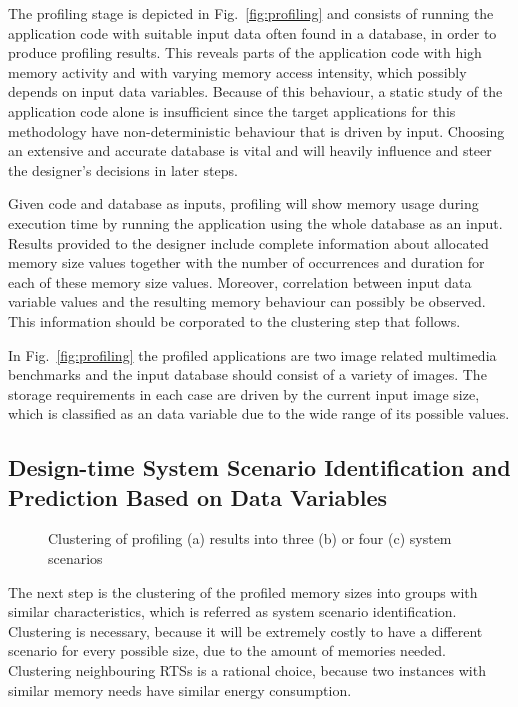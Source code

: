 \documentclass{acm_proc_article-sp}
\begin{document}
The profiling stage is depicted in Fig.~\ref{fig:profiling} and consists of running the application code with suitable input data often found in a database, in order to produce profiling results. This reveals parts of the application code with high memory activity and with varying memory access intensity, which possibly depends on input data variables. Because of this behaviour, a static study of the application code alone is insufficient since the target applications for this methodology have non-deterministic behaviour that is driven by input. Choosing an extensive and accurate database is vital and will heavily influence and steer the designer's decisions in later steps. 

Given code and database as inputs, profiling will show memory usage during execution time by running the application using the whole database as an input. Results provided to the designer include complete information about allocated memory size values together with the number of occurrences and duration for each of these memory size values. Moreover, correlation between input data variable values and the resulting memory behaviour can possibly be observed. This information should be corporated to the clustering step that follows. 

In Fig.~\ref{fig:profiling} the profiled applications are two image related multimedia benchmarks and the input database should consist of a variety of images. The storage requirements in each case are driven by the current input image size, which is classified as an data variable due to the wide range of its possible values. 

\subsection{Design-time System Scenario Identification and Prediction Based on Data Variables}

\begin{figure}[!t]
\centering
\caption{Clustering of profiling (a) results into three (b) or four (c) system scenarios}
\label{fig:clustering}
\end{figure}

The next step is the clustering of the profiled memory sizes into groups with similar characteristics, which is referred as system scenario identification. Clustering is necessary, because it will be extremely costly to have a different scenario for every possible size, due to the amount of memories needed. Clustering neighbouring RTSs is a rational choice, because two instances with similar memory needs have similar energy consumption. 
\end{document}
